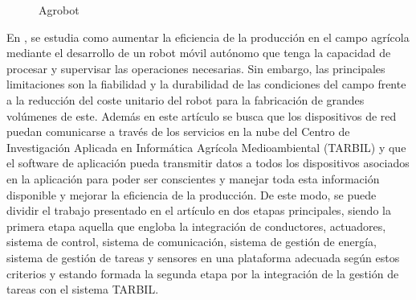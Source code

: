 \begin{figure}[H]
    \begin{center}
      \subcapcentertrue
      \hspace{2mm}
    \end{center}
    \caption{Agrobot}
    \label{fig:Agrobot}
  \end{figure}

En \cite{Durmus15}, se estudia como aumentar la eficiencia de la producción en el campo agrícola mediante el desarrollo de un robot móvil autónomo que tenga la capacidad de procesar y supervisar las operaciones necesarias. Sin embargo, las principales limitaciones son la fiabilidad y la durabilidad de las condiciones del campo frente a la reducción del coste unitario del robot para la fabricación de grandes volúmenes de este. Además en este artículo se busca que los dispositivos de red puedan comunicarse a través de los servicios en la nube del Centro de Investigación Aplicada en Informática Agrícola Medioambiental (TARBIL) y que el software de aplicación pueda transmitir datos a todos los dispositivos asociados en la aplicación para poder ser conscientes y manejar toda esta información disponible y mejorar la eficiencia de la producción. De este modo, se puede dividir el trabajo presentado en el artículo en dos etapas principales, siendo la primera etapa aquella que engloba la integración de conductores, actuadores, sistema de control, sistema de comunicación, sistema de gestión de energía, sistema de gestión de tareas y sensores en una plataforma adecuada según estos criterios y estando formada la segunda etapa por la integración de la gestión de tareas con el sistema TARBIL.\\


